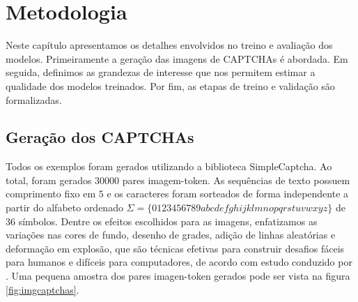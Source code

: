 \chapter{Metodologia} \label{cap:metodologia}

Neste capítulo apresentamos os detalhes envolvidos no treino e avaliação dos modelos. Primeiramente a geração das imagens de CAPTCHAs é abordada. Em seguida, definimos as grandezas de interesse que nos permitem estimar a qualidade dos modelos treinados. Por fim, as etapas de treino e validação são formalizadas.


\section{Geração dos CAPTCHAs}

Todos os exemplos foram gerados utilizando a biblioteca SimpleCaptcha\cite{simplecaptcha}. Ao total, foram gerados $30000$ pares imagem-token. As sequências de texto possuem comprimento fixo em $5$ e os caracteres foram sorteados de forma independente a partir do alfabeto ordenado $\Sigma = \{0123456789abcdefghijklmnopqrstuvwxyz\}$ de $36$ símbolos. Dentre os efeitos escolhidos para as imagens, enfatizamos as variações nas cores de fundo, desenho de grades, adição de linhas aleatórias e deformação em explosão, que são técnicas efetivas para construir desafios fáceis para humanos e difíceis para computadores, de acordo com estudo conduzido por \cite{lectures2005HIP}. Uma pequena amostra dos pares imagen-token gerados pode ser vista na figura \ref{fig:imgcaptchas}.

